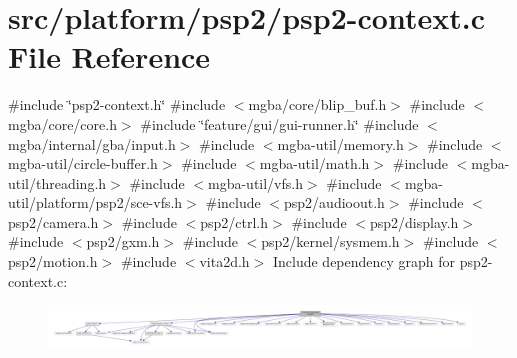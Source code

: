 \hypertarget{psp2-context_8c}{}\section{src/platform/psp2/psp2-\/context.c File Reference}
\label{psp2-context_8c}
{\ttfamily \#include \char`\"{}psp2-\/context.\+h\char`\"{}}\newline
{\ttfamily \#include $<$mgba/core/blip\+\_\+buf.\+h$>$}\newline
{\ttfamily \#include $<$mgba/core/core.\+h$>$}\newline
{\ttfamily \#include \char`\"{}feature/gui/gui-\/runner.\+h\char`\"{}}\newline
{\ttfamily \#include $<$mgba/internal/gba/input.\+h$>$}\newline
{\ttfamily \#include $<$mgba-\/util/memory.\+h$>$}\newline
{\ttfamily \#include $<$mgba-\/util/circle-\/buffer.\+h$>$}\newline
{\ttfamily \#include $<$mgba-\/util/math.\+h$>$}\newline
{\ttfamily \#include $<$mgba-\/util/threading.\+h$>$}\newline
{\ttfamily \#include $<$mgba-\/util/vfs.\+h$>$}\newline
{\ttfamily \#include $<$mgba-\/util/platform/psp2/sce-\/vfs.\+h$>$}\newline
{\ttfamily \#include $<$psp2/audioout.\+h$>$}\newline
{\ttfamily \#include $<$psp2/camera.\+h$>$}\newline
{\ttfamily \#include $<$psp2/ctrl.\+h$>$}\newline
{\ttfamily \#include $<$psp2/display.\+h$>$}\newline
{\ttfamily \#include $<$psp2/gxm.\+h$>$}\newline
{\ttfamily \#include $<$psp2/kernel/sysmem.\+h$>$}\newline
{\ttfamily \#include $<$psp2/motion.\+h$>$}\newline
{\ttfamily \#include $<$vita2d.\+h$>$}\newline
Include dependency graph for psp2-\/context.c\+:
\nopagebreak
\begin{figure}[H]
\begin{center}
\leavevmode
\includegraphics[width=350pt]{psp2-context_8c__incl}
\end{center}
\end{figure}

